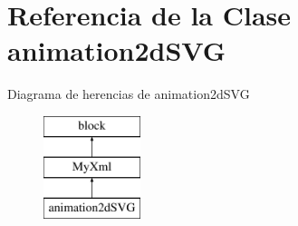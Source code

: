 \hypertarget{classanimation2dSVG}{\section{\-Referencia de la \-Clase animation2d\-S\-V\-G}
\label{classanimation2dSVG}
}
\-Diagrama de herencias de animation2d\-S\-V\-G\begin{figure}[H]
\begin{center}
\leavevmode
\includegraphics[height=3.000000cm]{classanimation2dSVG}
\end{center}
\end{figure}
